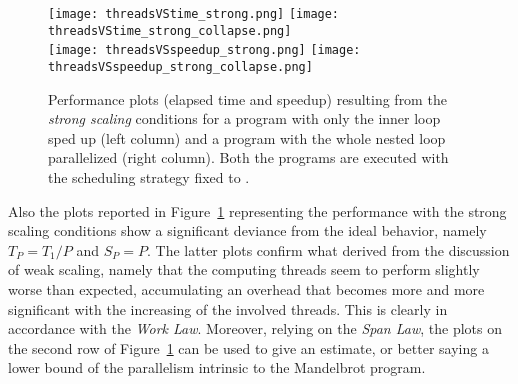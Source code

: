 \begin{figure}[h!]
    \centering
    \null\hfill
    \texttt{[image: threadsVStime\_strong.png]}
    \null\hfill
    \texttt{[image: threadsVStime\_strong\_collapse.png]}
    \null\hfill
    \\
    \null\hfill
    \texttt{[image: threadsVSspeedup\_strong.png]}
    \null\hfill
    \texttt{[image: threadsVSspeedup\_strong\_collapse.png]}
    \null\hfill
    \caption{\label{fig:strong_scale}
    Performance plots (elapsed time and speedup) resulting from the \emph{strong scaling} conditions for a program with only the inner loop sped up (left column) and a program with the whole nested loop parallelized (right column). Both the programs are executed with the scheduling strategy fixed to .}
\end{figure}

Also the plots reported in Figure~\ref{fig:strong_scale} representing the performance with the strong scaling conditions show a significant deviance from the ideal behavior, namely $T_P = T_1/P$ and $S_P = P$. The latter plots confirm what derived from the discussion of weak scaling, namely that the computing threads seem to perform slightly worse than expected, accumulating an overhead that becomes more and more significant with the increasing of the involved threads. This is clearly in accordance with the \emph{Work Law}. Moreover, relying on the \emph{Span Law}, the plots on the second row of Figure~\ref{fig:strong_scale} can be used to give an estimate, or better saying a lower bound of the parallelism intrinsic to the Mandelbrot program.
